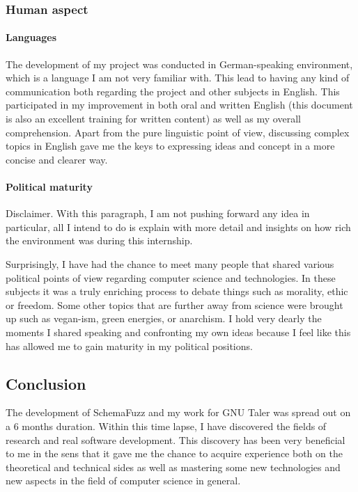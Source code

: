 		\subsubsection{Human aspect}
		
			\paragraph{Languages}
The development of my project was conducted in German-speaking environment, which is a language I am not very familiar with. 
This lead to having any kind of communication both regarding the project and other subjects in English. This participated in my improvement in both oral and written English (this document is also an excellent training for written content) as well as my overall comprehension.
Apart from the pure linguistic point of view, discussing complex topics in English gave me the keys to expressing ideas and concept in a more concise and clearer way. 			

			\paragraph{Political maturity}
Disclaimer. With this paragraph, I am not pushing forward any idea in particular, all I intend to do is explain with more detail and insights on how rich the environment was during this internship.			
			
Surprisingly, I have had the chance to meet many people that shared various political points of view regarding computer science and technologies. In these subjects it was a truly enriching process to debate things such as morality, ethic or freedom.
Some other topics that are further away from science were brought up such as vegan-ism, green energies, or anarchism.
I hold very dearly the moments I shared speaking and confronting my own ideas because I feel like this has allowed me to gain maturity in my political positions.		
	
	\clearpage

	\subsection{Conclusion}
   
The development of SchemaFuzz and my work for GNU Taler was spread out on a 6 months duration.
Within this time lapse, I have discovered the fields of research and real software development.
This discovery has been very beneficial to me in the sens that it gave me the chance to acquire experience both on the theoretical and technical sides as well as mastering some new technologies and new aspects in the field of computer science in general.


